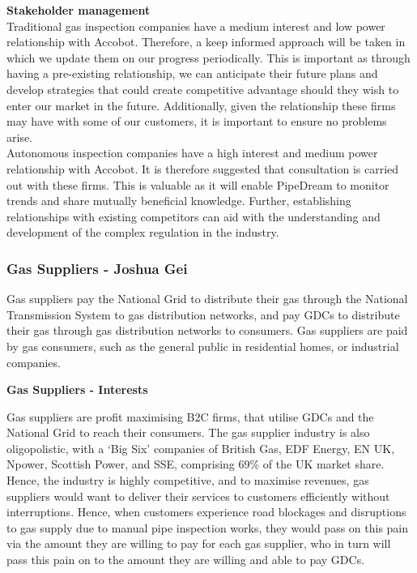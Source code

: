 \documentclass[11pt]{article}		%
\begin{document}
            \textbf{Stakeholder management}\\
            Traditional gas inspection companies have a medium interest and low power relationship with Accobot. Therefore, a keep informed approach will be taken in which we update them on our progress periodically. This is important as through having a pre-existing relationship, we can anticipate their future plans and develop strategies that could create competitive advantage should they wish to enter our market in the future. Additionally, given the relationship these firms may have with some of our customers, it is important to ensure no problems arise. \\
            \hspace*{3ex}Autonomous inspection companies have a high interest and medium power relationship with Accobot. It is therefore suggested that consultation is carried out with these firms. This is valuable as it will enable PipeDream to monitor trends and share mutually beneficial knowledge. Further, establishing relationships with existing competitors can aid with the understanding and development of the complex regulation in the industry.

		\subsubsection[Gas Suppliers]{Gas Suppliers - Joshua Gei}
		Gas suppliers pay the National Grid to distribute their gas through the National Transmission System to gas distribution networks, and pay GDCs to distribute their gas through gas distribution networks to consumers. Gas suppliers are paid by gas consumers, such as the general public in residential homes, or industrial companies.   
		
		\textbf{Gas Suppliers - Interests}
		
	    Gas suppliers are profit maximising B2C firms, that utilise GDCs and the National Grid to reach their consumers. The gas supplier industry is also oligopolistic, with a ‘Big Six’ companies of British Gas, EDF Energy, EN UK, Npower, Scottish Power, and SSE, comprising 69\% of the UK market share. 
        \\Hence, the industry is highly competitive, and to maximise revenues, gas suppliers would want to deliver their services to customers efficiently without interruptions. Hence, when customers experience road blockages and disruptions to gas supply due to manual pipe inspection works, they would pass on this pain via the amount they are willing to pay for each gas supplier, who in turn will pass this pain on to the amount they are willing and able to pay GDCs.
        
\end{document}
